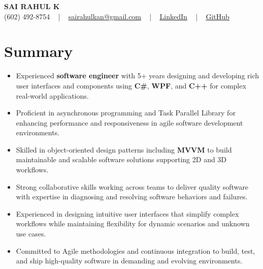 \documentclass[letterpaper,11pt]{article}
\newcommand{\resumeItem}[1]{
  \item\footnotesize{
    {#1 \vspace{-2pt}}
  }
}
\newcommand{\resumeItemListStart}{\begin{itemize}[leftmargin=*]}
\newcommand{\resumeItemListEnd}{\end{itemize}\vspace{-5pt}}
\begin{document}
\begin{center}
    {\fontsize{14pt}{12pt}\selectfont \textbf{\MakeUppercase{Sai Rahul K}}}\\ \vspace{2pt}
    \fontsize{10pt}{12pt}\selectfont (602) 492-8754 ~ | ~ \href{mailto:sairahulkan@gmail.com}{sairahulkan@gmail.com} ~ | ~
    \href{https://www.linkedin.com/in/rq123/}{\color{blue}\underline{LinkedIn}} ~ | ~
    \href{https://github.com/kanrahuldo}{\color{blue}\underline{GitHub}}~
    \vspace{-8pt}
\end{center}

\section{Summary}
\fontsize{9pt}{10pt}\selectfont
\resumeItemListStart
    \resumeItem{Experienced \textbf{software engineer} with 5+ years designing and developing rich user interfaces and components using \textbf{C#}, \textbf{WPF}, and \textbf{C++} for complex real-world applications.} \vspace{-3pt}
    \resumeItem{Proficient in asynchronous programming and Task Parallel Library for enhancing performance and responsiveness in agile software development environments.} \vspace{-3pt}
    \resumeItem{Skilled in object-oriented design patterns including \textbf{MVVM} to build maintainable and scalable software solutions supporting 2D and 3D workflows.} \vspace{-3pt}
    \resumeItem{Strong collaborative skills working across teams to deliver quality software with expertise in diagnosing and resolving software behaviors and failures.} \vspace{-3pt}
    \resumeItem{Experienced in designing intuitive user interfaces that simplify complex workflows while maintaining flexibility for dynamic scenarios and unknown use cases.} \vspace{-3pt}
    \resumeItem{Committed to Agile methodologies and continuous integration to build, test, and ship high-quality software in demanding and evolving environments.} \vspace{-3pt}
\resumeItemListEnd
\vspace{-6pt}
\end{document}
